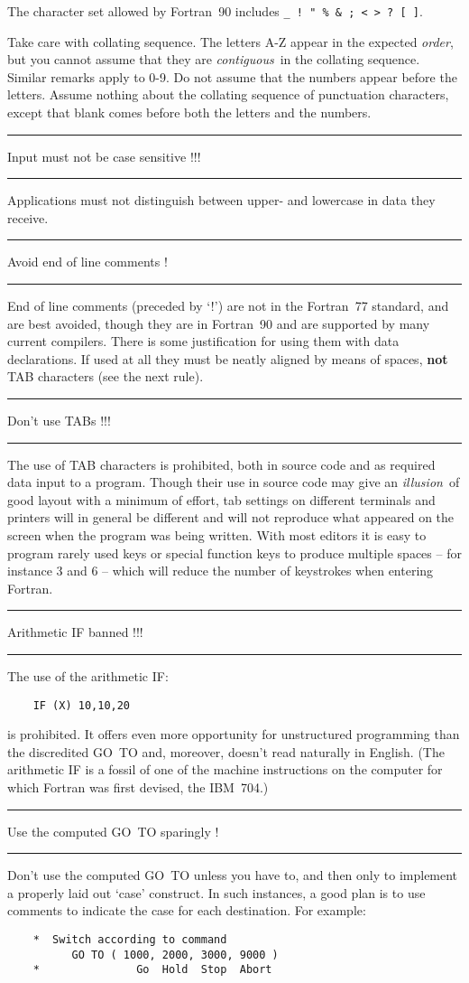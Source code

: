 \documentclass[twoside,11pt]{article}
\newcounter{sruleno}
\newcommand{\srule}[1]{
    \addtocounter{sruleno}{1}
    \goodbreak
    \rule[0.5ex]{\textwidth}{0.3mm}
    {\Large #1 \hfill {\thesruleno}}
    \rule[0.5ex]{\textwidth}{0.1mm}
}
\newcommand{\srule}[1]{
       \addtocounter{sruleno}{1}
       \begin{rawhtml} <HR> \end{rawhtml}
       {\Large \thesruleno}~~~~{\Large #1}
       \begin{rawhtml} <HR> \end{rawhtml}
       \end{tabular}
  }
\renewcommand{\_}{{\tt\char'137}}
\begin{document}
The character set allowed by Fortran~90 includes \verb|_ ! " % & ; < > ? [ ]|.

Take care with collating sequence.  The letters A-Z appear in the
expected {\it order}, but you cannot assume
that they are {\it contiguous}\, in
the collating sequence.  Similar remarks apply to 0-9.  Do not
assume that the numbers appear before the letters.  Assume
nothing about the collating sequence of punctuation characters,
except that blank comes before both the letters and the numbers.

\srule{Input must not be case sensitive !!!}
Applications must not distinguish between upper- and lowercase in data they
receive.

\srule{Avoid end of line comments !}
End of line comments (preceded by `!') are not in the
Fortran~77 standard, and are best avoided, though they
are in Fortran~90 and are supported by many current compilers.
There is some justification for using them with data declarations.
If used at all they must be neatly aligned by means of spaces, {\bf not}
TAB characters (see the next rule).

\srule{Don't use TABs !!!}
The use of TAB characters is prohibited, both in source code and as required
data input to a program.
Though their use in source code may give an {\it illusion}\,
of good layout with a
minimum of effort, tab settings on different terminals and printers will in
general be different and will not reproduce what appeared on the screen when the
program was being written.
With most editors it is easy to program rarely
used keys or special function keys to produce multiple spaces -- for instance
3 and 6 -- which will reduce the number of keystrokes when entering Fortran.

\srule{Arithmetic IF banned !!!}
The use of the arithmetic IF:
\begin{verbatim}
    IF (X) 10,10,20
\end{verbatim}
is prohibited.
It offers even more opportunity for unstructured programming than the
discredited GO~TO and, moreover, doesn't read naturally in
English.
(The arithmetic IF is a fossil of one of the
machine instructions on the computer for which Fortran was
first devised, the IBM~704.)

\srule{Use the computed GO~TO sparingly !}
Don't use the computed GO~TO unless you have to, and then only to
implement a properly laid out `case' construct.  In such instances, a good
plan is to use comments to indicate the case for each destination.
For example:
\begin{verbatim}
    *  Switch according to command
          GO TO ( 1000, 2000, 3000, 9000 )
    *               Go  Hold  Stop  Abort
\end{verbatim}
\end{document}
